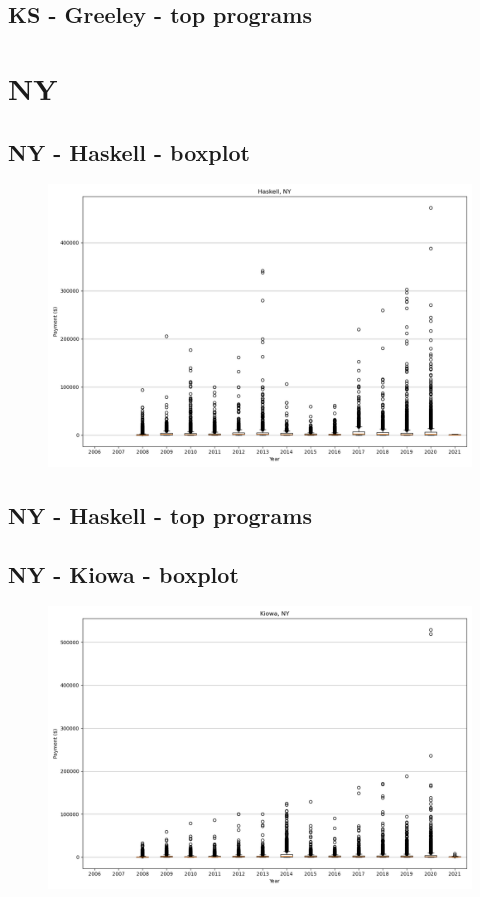 \subsection*{KS - Greeley - top programs}

\newpage
\section*{NY}
\subsection*{NY - Haskell - boxplot}
\begin{figure}[h]
\centering
\includegraphics[width=7in]{../output/boxplots/counties/Haskell-NY_boxplot.png}
\end{figure}


\subsection*{NY - Haskell - top programs}

\newpage
\subsection*{NY - Kiowa - boxplot}
\begin{figure}[h]
\centering
\includegraphics[width=7in]{../output/boxplots/counties/Kiowa-NY_boxplot.png}
\end{figure}


